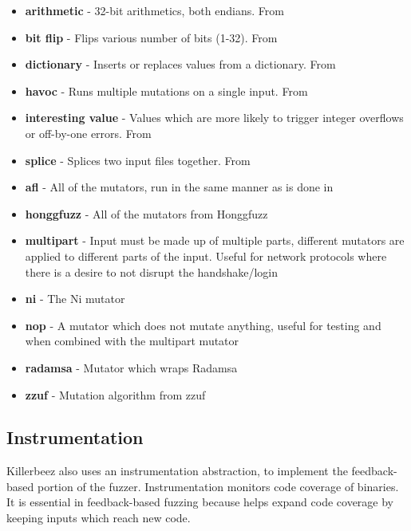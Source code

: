 \begin{itemize}[noitemsep]
\item \textbf{arithmetic} - 32-bit arithmetics, both endians. From \AFL{}
\item \textbf{bit flip} - Flips various number of bits (1-32). From \AFL{}
\item \textbf{dictionary} - Inserts or replaces values from a dictionary. From \AFL{}
\item \textbf{havoc} - Runs multiple mutations on a single input. From \AFL{}
\item \textbf{interesting value} - Values which are more likely to trigger
                                   integer overflows or off-by-one errors. From
                                   \AFL{}
\item \textbf{splice} - Splices two input files together. From \AFL{}
\item \textbf{afl} - All of the \AFL{} mutators, run in the same manner as is
                     done in \AFL{}
\item \textbf{honggfuzz} - All of the mutators from Honggfuzz
\item \textbf{multipart} - Input must be made up of multiple parts, different
                           mutators are applied to different parts of the
                           input. Useful for network protocols where there is
                           a desire to not disrupt the handshake/login
\item \textbf{ni} - The Ni mutator
\item \textbf{nop} - A mutator which does not mutate anything, useful for
                     testing and when combined with the multipart mutator
\item \textbf{radamsa} - Mutator which wraps Radamsa\cite{radamsa}
\item \textbf{zzuf} - Mutation algorithm from zzuf\cite{zzuf}
\end{itemize}




\subsection{Instrumentation} \label{Instrumentation}
Killerbeez also uses an instrumentation abstraction, to implement the
feedback-based portion of the fuzzer. Instrumentation monitors code coverage of
binaries. It is essential in feedback-based fuzzing because helps expand code
coverage by keeping inputs which reach new code.

